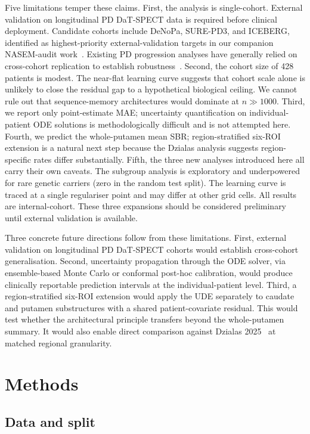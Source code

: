 Five limitations temper these claims. First, the analysis is single-cohort. External validation on longitudinal PD DaT-SPECT data is required before clinical deployment. Candidate cohorts include DeNoPa, SURE-PD3, and ICEBERG, identified as highest-priority external-validation targets in our companion NASEM-audit work~\cite{dupre2026paper10}. Existing PD progression analyses have generally relied on cross-cohort replication to establish robustness~\cite{severson2021progression, oxtoby2021ebm}. Second, the cohort size of 428 patients is modest. The near-flat learning curve suggests that cohort scale alone is unlikely to close the residual gap to a hypothetical biological ceiling. We cannot rule out that sequence-memory architectures would dominate at $n \gg 1000$. Third, we report only point-estimate MAE; uncertainty quantification on individual-patient ODE solutions is methodologically difficult and is not attempted here. Fourth, we predict the whole-putamen mean SBR; region-stratified six-ROI extension is a natural next step because the Dzialas analysis suggests region-specific rates differ substantially. Fifth, the three new analyses introduced here all carry their own caveats. The subgroup analysis is exploratory and underpowered for rare genetic carriers (zero in the random test split). The learning curve is traced at a single regulariser point and may differ at other grid cells. All results are internal-cohort. These three expansions should be considered preliminary until external validation is available.

Three concrete future directions follow from these limitations. First, external validation on longitudinal PD DaT-SPECT cohorts would establish cross-cohort generalisation. Second, uncertainty propagation through the ODE solver, via ensemble-based Monte Carlo or conformal post-hoc calibration, would produce clinically reportable prediction intervals at the individual-patient level. Third, a region-stratified six-ROI extension would apply the UDE separately to caudate and putamen substructures with a shared patient-covariate residual. This would test whether the architectural principle transfers beyond the whole-putamen summary. It would also enable direct comparison against Dzialas 2025~\cite{dzialas2025dat} at matched regional granularity.

\section{Methods}

\subsection{Data and split}

